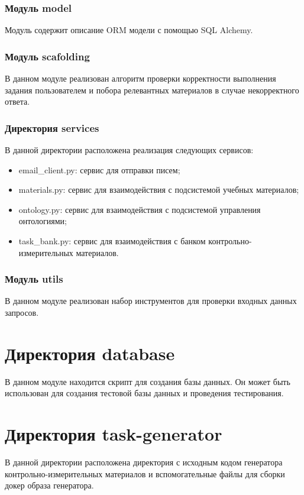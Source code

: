 \documentclass[a4paper,12pt]{article}
\begin{document}
    \subsubsection{Модуль model}
    Модуль содержит описание ORM модели с помощью SQL Alchemy.

    \subsubsection{Модуль scafolding}
    В данном модуле реализован алгоритм проверки корректности выполнения задания пользователем и побора релевантных материалов в случае некорректного ответа.

    \subsubsection{Директория services}
    В данной директории расположена реализация следующих сервисов:
    \begin{itemize}
        \item email\_client.py: сервис для отправки писем;
        \item materials.py: сервис для взаимодействия с подсистемой учебных материалов;
        \item ontology.py: сервис для взаимодействия с подсистемой управления онтологиями;
        \item task\_bank.py: сервис для взаимодействия с банком контрольно-измерительных материалов.
    \end{itemize}

    \subsubsection{Модуль utils}
    В данном модуле реализован набор инструментов для проверки входных данных запросов.


    \section{Директория database}
    В данном модуле находится скрипт для создания базы данных. Он может быть использован для создания тестовой базы данных и проведения тестирования.


    \section{Директория task-generator}
    В данной директории расположена директория с исходным кодом генератора контрольно-измерительных материалов и вспомогательные файлы для сборки докер образа генератора.
\end{document}
